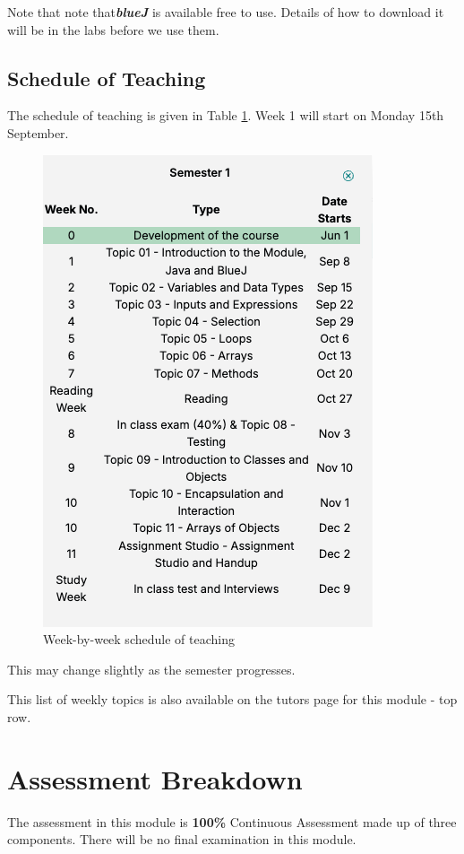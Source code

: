\documentclass{article}
\begin{document}
Note that note that\textbf{\textit{blueJ}}
is available  free to use. Details of how to download it will be in the labs before we use them. 
\pagebreak 

\subsection{Schedule of Teaching}
The schedule of teaching is given in Table \ref{schedule}. 
 Week 1 will start on Monday 15th September.
\begin{figure}[h]
    \centering
    \includegraphics[width=.6\textwidth]{img/schedule.png}
    \caption{Week-by-week schedule of teaching}
    \label{schedule}
    \end{figure}
This may change slightly as the semester progresses.

This list of weekly topics is also available on the tutors page for this module - top row.
  \pagebreak
\section{Assessment Breakdown} 
The assessment in this module is \textbf{100\%} Continuous Assessment made up of three components. There will be no final examination in this module. 
\end{document}
